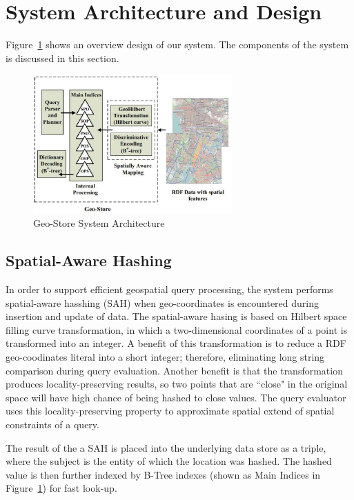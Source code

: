 \section{System Architecture and Design}

Figure~\ref{fig:architect} shows an overview design of our system. The components of the system is discussed in this section.

\begin{figure}
\centering
\includegraphics[width=3in]{images/architect.eps}
\caption{Geo-Store System Architecture}\label{fig:architect}
\end{figure}

\subsection{Spatial-Aware Hashing}

In order to support efficient geospatial query processing, the system performs spatial-aware hasshing (SAH) when geo-coordinates is encountered during insertion and update of data. The spatial-aware hasing is based on Hilbert space filling curve transformation, in which a two-dimensional coordinates of a point is transformed into an integer. A benefit of this transformation is to reduce a RDF geo-coodinates literal into a short integer; therefore, eliminating long string comparison during query evaluation. Another benefit is that the transformation produces locality-preserving results, so two points that are ``close" in the original space will have high chance of being hashed to close values. The query evaluator uses this locality-preserving property to approximate spatial extend of spatial constraints of a query.

The result of the a SAH is placed into the underlying data store as a triple, where the subject is the entity of which the location was hashed. The hashed value is then further indexed by B-Tree indexes (shown as Main Indices in Figure~\ref{fig:architect}) for fast look-up.

